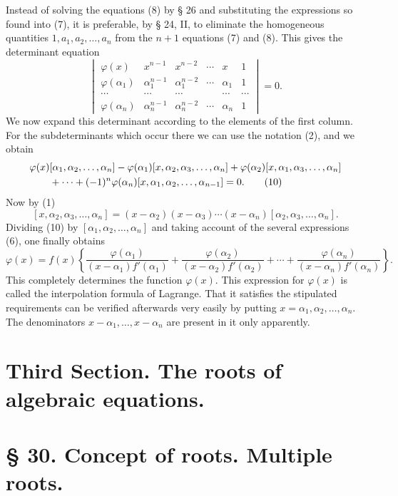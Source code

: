 \documentclass[11pt]{article}
\begin{document}
Instead of solving the equations (8) by § 26 and substituting the expressions so found into (7), it is preferable, by § 24, II, to eliminate the homogeneous quantities $1,a_1,a_2,
\ldots,a_n$ from the $n+1$ equations (7) and (8). This gives the determinant equation
\[
\begin{vmatrix}
 \varphi(x)&x^{n-1}&x^{n-2}&\cdots&x&1\\
 \varphi(\alpha_1)&\alpha_1^{n-1}&\alpha_1^{n-2}&\cdots&\alpha_1&1\\
 \cdots&\cdots&\cdots&&\cdots&\cdots\\
 \varphi(\alpha_n)&\alpha_n^{n-1}&\alpha_n^{n-2}&\cdots&\alpha_n&1
\end{vmatrix}=0.\tag{9}
\]
We now expand this determinant according to the elements of the first column. For the subdeterminants which occur there we can use the notation (2), and we obtain
\begin{align}
&\varphi(x)[\alpha_1,\alpha_2,\ldots,\alpha_n]
-\varphi(\alpha_1)[x,\alpha_2,\alpha_3,\ldots,\alpha_n]
+\varphi(\alpha_2)[x,\alpha_1,\alpha_3,\ldots,\alpha_n]
\notag\\
&\qquad+\cdots+(-1)^n\varphi(\alpha_n)[x,\alpha_1,\alpha_2,\ldots,\alpha_{n-1}]=0.\tag{10}
\end{align}
Now by (1)
\[
 [x,\alpha_2,\alpha_3,
 \ldots,\alpha_n]=(x-\alpha_2)(x-\alpha_3)\cdots(x-\alpha_n)[\alpha_2,\alpha_3,
 \ldots,\alpha_n].
\]
Dividing (10) by $[\alpha_1,\alpha_2,
\ldots,\alpha_n]$ and taking account of the several expressions (6), one finally obtains
\begin{equation}
 \varphi(x)=f(x)\left\{\frac{\varphi(\alpha_1)}{(x-\alpha_1)f'(\alpha_1)}+\frac{\varphi(\alpha_2)}{(x-\alpha_2)f'(\alpha_2)}+\cdots+\frac{\varphi(\alpha_n)}{(x-\alpha_n)f'(\alpha_n)}\right\}.\tag{11}
\end{equation}
This completely determines the function $\varphi(x)$. This expression for $\varphi(x)$ is called the interpolation formula of Lagrange. That it satisfies the stipulated requirements can be verified afterwards very easily by putting $x=\alpha_1,\alpha_2,
\ldots,\alpha_n$. The denominators $x-\alpha_1,
\ldots,x-\alpha_n$ are present in it only apparently.




\section*{Third Section. The roots of algebraic equations.}

\section*{§ 30. Concept of roots. Multiple roots.}
\end{document}
